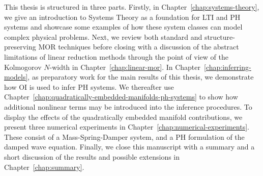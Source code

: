 This thesis is structured in three parts.
Firstly, in Chapter~\ref{chap:systems-theory}, we give an introduction to Systems Theory as a foundation for \ac{LTI} and \ac{PH} systems and showcase some examples of how these system classes can model complex physical problems.
Next, we review both standard and structure-preserving \ac{MOR} techniques before closing with a discussion of the abstract limitations of linear reduction methods through the point of view of the Kolmogorov $N$-width in Chapter~\ref{chap:linear-mor}.
In Chapter~\ref{chap:inferring-models}, as preparatory work for the main results of this thesis, we demonstrate how \ac{OI} is used to infer \ac{PH} systems.
We thereafter use Chapter~\ref{chap:quadratically-embedded-manifolds-ph-systems} to show how additional nonlinear terms may be introduced into the inference procedures.
To display the effects of the quadratically embedded manifold contributions, we present three numerical experiments in Chapter~\ref{chap:numerical-experiments}.
These consist of a Mass-Spring-Damper system, and a \ac{PH} formulation of the damped wave equation.
Finally, we close this manuscript with a summary and a short discussion of the results and possible extensions in Chapter~\ref{chap:summary}.
